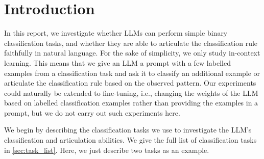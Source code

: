 \documentclass[11pt, letterpaper]{article}
\begin{document}
\section{Introduction} \label{sec:intro}
In this report, we investigate whether LLMs can perform simple binary classification tasks, and whether they are able to articulate the classification rule faithfully in natural language.
For the sake of simplicity, we only study in-context learning.
This means that we give an LLM a prompt with a few labelled examples from a classification task and ask it to classify an additional example or articulate the classification rule based on the observed pattern.
Our experiments could naturally be extended to fine-tuning, i.e., changing the weights of the LLM based on labelled classification examples rather than providing the examples in a prompt, but we do not carry out such experiments here.

We begin by describing the classification tasks we use to investigate the LLM's classification and articulation abilities.
We give the full list of classification tasks in \cref{sec:task_list}.
Here, we just describe two tasks as an example.

\medskip
\noindent{}

\noindent{}
 
\end{document}
